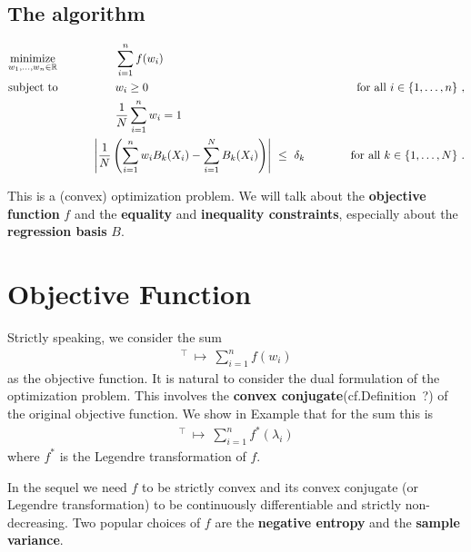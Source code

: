 \subsection*{The algorithm}
\begin{fproblem}
  \label{bw:1:primal}
\begin{align*}
    &\underset{w_1, \ldots, w_n \in \R}
    {\text{minimize}}
    &&\qquad\qquad
    \sum_{i = 1}^{n} 
    f(w_i)
    &&&
    \\
    &\text{subject to}
    &&\qquad\qquad
    w_i 
    \ge
    0
    &&&
    \qquad
    \text{for all}\ 
    i \in \left\{ 1, \ldots, n \right\}
    \,,
    \\
    & 
    &&\qquad\qquad
    \frac{1}{N}
    \sum_{i=1}^{n} 
    w_i
    =1
    \\
    & 
    &&\qquad
    \left| 
      \frac{1}{N} 
      \left( 
      \sum_{i = 1}^{n} 
      w_i
      B_k(X_i)
      -
      \sum_{i=1}^{N} 
      B_k(X_i)
      \right)
    \right|
    \ 
    \le 
    \ 
    \delta_k
    &&&
    \qquad
    \text{for all}\ 
    k \in \left\{ 1, \ldots, N \right\}
    \,.
\end{align*}
\end{fproblem}
This is a (convex) optimization problem. We will talk about the \textbf{objective function} $f$ and
the \textbf{equality} and \textbf{inequality constraints}, especially about the 
\textbf{regression basis} $B$.

\section*{Objective Function}
Strictly speaking, we consider the sum
\begin{gather}
  [w_1,\ldots,w_n]^\top
  \ 
  \mapsto
  \ 
  \sum_{i=1}^{n} 
  f(w_i)
\end{gather}
as the objective function. It is natural to consider the dual formulation of the optimization problem. This involves the \textbf{convex conjugate}(cf.Definition~?) of the original objective function. We show in Example that for the sum this is
\begin{gather}
  [\lambda_1,\ldots,\lambda_n]^\top
  \ 
  \mapsto
  \ 
  \sum_{i=1}^{n} 
  f^*(\lambda_i)
\end{gather}
where $f^*$ is the Legendre transformation of $f$.

In the sequel we need $f$ to be strictly convex and its convex conjugate (or Legendre transformation) to be continuously differentiable and strictly non-decreasing.
Two popular choices of $f$ are the \textbf{negative entropy} and the \textbf{sample variance}.
